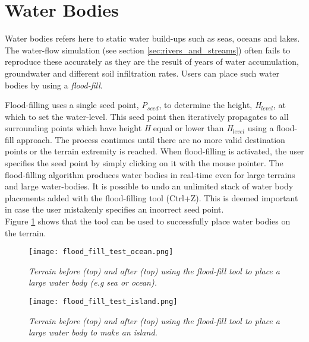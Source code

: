 \section{Water Bodies} \label{sec:water_bodies}

Water bodies refers here to static water build-ups such as seas, oceans and lakes. The water-flow simulation (see section \ref{sec:rivers_and_streams}) often fails to reproduce these accurately as they are the result of years of water accumulation, groundwater and different soil infiltration rates. Users can place such water bodies by using a \textit{flood-fill}.

Flood-filling uses a single seed point, \textit{P$_{seed}$}, to determine the height, \textit{H$_{level}$}, at which to set the water-level. This seed point then iteratively propagates to all surrounding points which have height \textit{H} equal or lower than \textit{H$_{level}$} using a flood-fill approach. The process continues until there are no more valid destination points or the terrain extremity is reached. When flood-filling is activated, the user specifies the seed point by simply clicking on it with the mouse pointer. The flood-filling algorithm produces water bodies in real-time even for large terrains and large water-bodies. It is possible to undo an unlimited stack of water body placements added with the flood-filling tool (Ctrl+Z). This is deemed important in case the user mistakenly specifies an incorrect seed point. \\

Figure \ref{fig:flood_fill_test} shows that the tool can be used to successfully place water bodies on the terrain.

\begin{figure}
\center
	\texttt{[image: flood\_fill\_test\_ocean.png]}
	\caption{ \textit{Terrain before (top) and after (top) using the flood-fill tool to place a large water body (e.g sea or ocean).} }	
	\label{fig:flood_fill_test}
\end{figure}

\begin{figure}
\center
	\texttt{[image: flood\_fill\_test\_island.png]}
	\caption{ \textit{Terrain before (top) and after (top) using the flood-fill tool to place a large water body to make an island.} }	
	\label{fig:flood_fill_test_island}
\end{figure}
